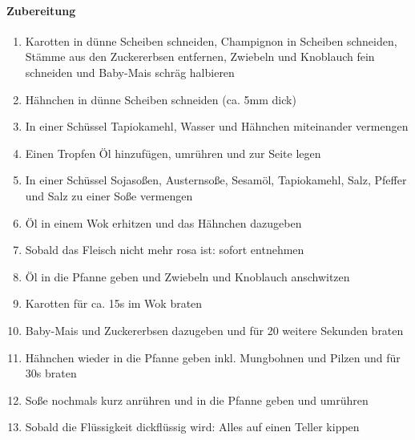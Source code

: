 \paragraph{Zubereitung}
\begin{enumerate}[noitemsep]
	\item Karotten in dünne Scheiben schneiden, Champignon in Scheiben schneiden, Stämme aus den Zuckererbsen entfernen, Zwiebeln und Knoblauch fein schneiden und Baby-Mais schräg halbieren
	\item Hähnchen in dünne Scheiben schneiden (ca. 5mm dick)
	\item In einer Schüssel Tapiokamehl, Wasser und Hähnchen miteinander vermengen
	\item Einen Tropfen Öl hinzufügen, umrühren und zur Seite legen
	\item In einer Schüssel Sojasoßen, Austernsoße, Sesamöl, Tapiokamehl, Salz, Pfeffer und Salz zu einer Soße vermengen
	\item Öl in einem Wok erhitzen und das Hähnchen dazugeben
	\item Sobald das Fleisch nicht mehr rosa ist: sofort entnehmen
	\item Öl in die Pfanne geben und Zwiebeln und Knoblauch anschwitzen
	\item Karotten für ca. 15s im Wok braten
	\item Baby-Mais und Zuckererbsen dazugeben und für 20 weitere Sekunden braten
	\item Hähnchen wieder in die Pfanne geben inkl. Mungbohnen und Pilzen und für 30s braten
	\item Soße nochmals kurz anrühren und in die Pfanne geben und umrühren
	\item Sobald die Flüssigkeit dickflüssig wird: Alles auf einen Teller kippen
\end{enumerate}